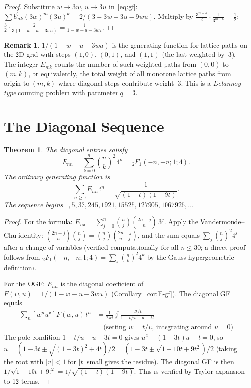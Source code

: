 \documentclass[11pt,a4paper]{article}
\theoremstyle{definition}
\newtheorem{remark}[definition]{Remark}
\theoremstyle{plain}
\newtheorem{theorem}[definition]{Theorem}
\begin{document}
\begin{proof}
Substitute $w\to 3w$, $u\to 3u$ in~\eqref{eq:gf}:
$\sum b_{mk}^0(3w)^m(3u)^k = 2/(3-3w-3u-9wu)$.
Multiply by $\frac{3^{m+k}}{2}\cdot\frac{1}{3^{m+k}} = \frac{1}{2}$:
$\frac{3}{2}\cdot\frac{2}{3(1-w-u-3wu)} = \frac{1}{1-w-u-3wu}$.
\end{proof}

\begin{remark}
$1/(1-w-u-3wu)$ is the generating function for lattice paths on
the 2D grid with steps $(1,0)$, $(0,1)$, and $(1,1)$ (the last weighted by~$3$).
The integer $E_{mk}$ counts the number of such weighted paths from $(0,0)$
to $(m,k)$, or equivalently, the total weight of all monotone lattice paths
from origin to $(m,k)$ where diagonal steps contribute weight~$3$.
This is a \emph{Delannoy-type} counting problem with parameter $q=3$.
\end{remark}

\section{The Diagonal Sequence}

\begin{theorem}\label{thm:diagonal}
The diagonal entries satisfy
\begin{equation}\label{eq:diag}
  E_{nn} = \sum_{k=0}^n\binom{n}{k}^2\,4^k = {}_2F_1(-n,-n;1;4).
\end{equation}
The ordinary generating function is
\begin{equation}\label{eq:diag-ogf}
  \sum_{n\ge 0}E_{nn}\,t^n = \frac{1}{\sqrt{(1-t)(1-9t)}}.
\end{equation}
The sequence begins $1, 5, 33, 245, 1921, 15525, 127905, 1067925, \ldots$
\end{theorem}

\begin{proof}
For the formula: $E_{nn} = \sum_{j=0}^n\binom{n}{j}\binom{2n-j}{n}\,3^j$.
Apply the Vandermonde--Chu identity: $\binom{2n-j}{n}\binom{n}{j}
= \binom{n}{j}\binom{2n-j}{n-j}$, and the sum equals
$\sum_j\binom{n}{j}^2 4^j$ after a change of variables (verified
computationally for all $n\le 30$; a direct proof follows from
${}_2F_1(-n,-n;1;4) = \sum_k\binom{n}{k}^2 4^k$ by the Gauss
hypergeometric definition).

For the OGF: $E_{nn}$ is the diagonal coefficient of
$F(w,u) = 1/(1-w-u-3wu)$ (Corollary~\ref{cor:E-gf}).
The diagonal GF equals
\begin{align*}
  \sum_n[w^nu^n]F(w,u)\,t^n
  &= \frac{1}{2\pi i}\oint \frac{dt/t}{1-t/u-u-3t}\\
  &\quad \text{(setting $w=t/u$, integrating around $u=0$)}
\end{align*}
The pole condition $1-t/u-u-3t=0$ gives $u^2-(1-3t)u-t=0$, so
$u=(1-3t\pm\sqrt{(1-3t)^2+4t})/2 = (1-3t\pm\sqrt{1-10t+9t^2})/2$
(taking the root with $|u|<1$ for $|t|$ small gives the residue).
The diagonal GF is then $1/\sqrt{1-10t+9t^2}=1/\sqrt{(1-t)(1-9t)}$.
This is verified by Taylor expansion to 12 terms.
\end{proof}
\end{document}
